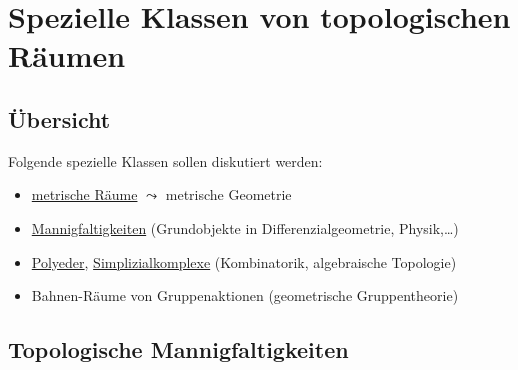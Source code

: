 \chapter{Spezielle Klassen von topologischen Räumen}

\section{Übersicht}

Folgende spezielle Klassen sollen diskutiert werden:
\begin{itemize}
  \item \hyperref[def:metrischerRaum]{metrische Räume} \( \leadsto \) metrische Geometrie
  \item \hyperref[def:topologischeMannigfaltigkeit]{Mannigfaltigkeiten} (Grundobjekte in Differenzialgeometrie, Physik,\dots)
  \item \hyperref[def:polyeder]{Polyeder}, \hyperref[def:simplizialkomplex]{Simplizialkomplexe} (Kombinatorik, algebraische Topologie)
  \item Bahnen-Räume von Gruppenaktionen (geometrische Gruppentheorie)
\end{itemize}

\section{Topologische Mannigfaltigkeiten}

